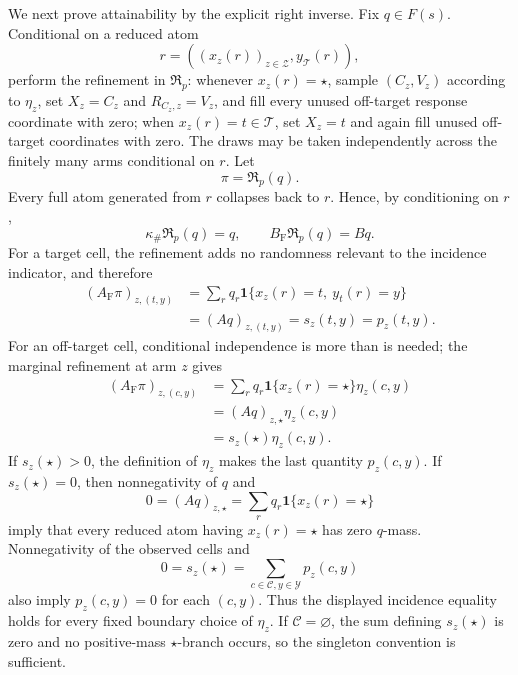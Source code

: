 We next prove attainability by the explicit right inverse.  Fix \(q\in F(s)\).  Conditional on a reduced atom
\[
r=((x_z(r))_{z\in\mathcal Z},y_{\mathcal T}(r)),
\]
perform the refinement in \(\mathfrak R_p\): whenever \(x_z(r)=\star\), sample \((C_z,V_z)\) according to \(\eta_z\), set \(X_z=C_z\) and \(R_{C_z,z}=V_z\), and fill every unused off-target response coordinate with zero; when \(x_z(r)=t\in\mathcal T\), set \(X_z=t\) and again fill unused off-target coordinates with zero.  The draws may be taken independently across the finitely many arms conditional on \(r\).  Let
\[
\pi=\mathfrak R_p(q).
\]
Every full atom generated from \(r\) collapses back to \(r\).  Hence, by conditioning on \(r\),
\[
\kappa_{\#}\mathfrak R_p(q)=q,
\qquad
B_{\mathrm F}\mathfrak R_p(q)=Bq.
\]
For a target cell, the refinement adds no randomness relevant to the incidence indicator, and therefore
\[
\begin{aligned}
(A_{\mathrm F}\pi)_{z,(t,y)}
&=\sum_rq_r\mathbf 1\{x_z(r)=t,\ y_t(r)=y\}\\
&=(Aq)_{z,(t,y)}=s_z(t,y)=p_z(t,y).
\end{aligned}
\]
For an off-target cell, conditional independence is more than is needed; the marginal refinement at arm \(z\) gives
\[
\begin{aligned}
(A_{\mathrm F}\pi)_{z,(c,y)}
&=\sum_rq_r\mathbf 1\{x_z(r)=\star\}\eta_z(c,y)\\
&=(Aq)_{z,\star}\eta_z(c,y)\\
&=s_z(\star)\eta_z(c,y).
\end{aligned}
\]
If \(s_z(\star)>0\), the definition of \(\eta_z\) makes the last quantity \(p_z(c,y)\).  If \(s_z(\star)=0\), then nonnegativity of \(q\) and
\[
0=(Aq)_{z,\star}
=\sum_rq_r\mathbf 1\{x_z(r)=\star\}
\]
imply that every reduced atom having \(x_z(r)=\star\) has zero \(q\)-mass.  Nonnegativity of the observed cells and
\[
0=s_z(\star)=\sum_{c\in\mathcal C,y\in\mathcal Y}p_z(c,y)
\]
also imply \(p_z(c,y)=0\) for each \((c,y)\).  Thus the displayed incidence equality holds for every fixed boundary choice of \(\eta_z\).  If \(\mathcal C=\varnothing\), the sum defining \(s_z(\star)\) is zero and no positive-mass \(\star\)-branch occurs, so the singleton convention is sufficient.

